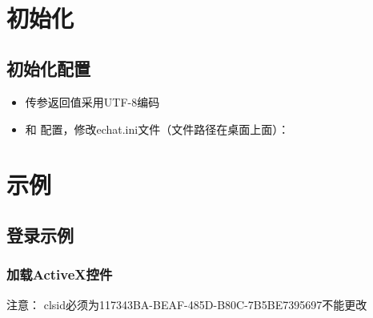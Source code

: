 \documentclass[letterpaper,10pt,english]{sphinxmanual}
\begin{document}
​


\section{初始化}
\label{\detokenize{csharp_activex:id2}}

\subsection{初始化配置}
\label{\detokenize{csharp_activex:id3}}\begin{itemize}
\item {} 
传参返回值采用UTF-8编码

\item {} 
 和 
配置，修改echat.ini文件（文件路径在桌面上面）：

%
\begin{sphinxVerbatim}[commandchars=\\\{\}]
\PYG{p}{[}\PYG{p}{]}
  
\PYG{p}{[}\PYG{p}{]}
  
\end{sphinxVerbatim}

\end{itemize}


\section{示例}
\label{\detokenize{csharp_activex:id4}}

\subsection{登录示例}
\label{\detokenize{csharp_activex:id5}}

\subsubsection{加载ActiveX控件}
\label{\detokenize{csharp_activex:activex}}
注意： clsid必须为117343BA-BEAF-485D-B80C-7B5BE7395697不能更改

%
\begin{sphinxVerbatim}[commandchars=\\\{\}]
  
\end{sphinxVerbatim}
\end{document}
